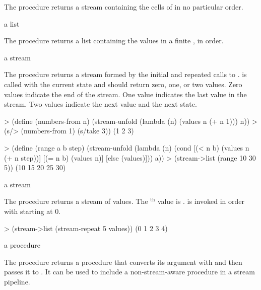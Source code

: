 The  procedure returns a stream containing the cells of
 in no particular order.

\begin{procedure}
\end{procedure}
\returns{} a list

The  procedure returns a list containing the values in a finite
, in order.

\begin{procedure}
\end{procedure}
\returns{} a stream

The  procedure returns a stream formed by the initial  and
repeated calls to .  is called with the current state and
should return zero, one, or two values. Zero values indicate the end of the stream. One
value indicates the last value in the stream. Two values indicate the next value and the
next state.

\codebegin
> (define (numbers-from n)
    (stream-unfold (lambda (n) (values n (+ n 1))) n))
> (s/> (numbers-from 1) (s/take 3))
(1 2 3)
\codeend

\codebegin
> (define (range a b step)
    (stream-unfold
     (lambda (n)
       (cond
        [(< n b) (values n (+ n step))]
        [(= n b) (values n)]
        [else (values)]))
     a))
> (stream->list (range 10 30 5))
(10 15 20 25 30)
\codeend

\begin{procedure}
\end{procedure}
\returns{} a stream

The  procedure returns a stream of  values. The
$^\textrm{th}$ value is .  is invoked in
order with  starting at 0.

\codebegin
> (stream->list (stream-repeat 5 values))
(0 1 2 3 4)
\codeend

\begin{procedure}
\end{procedure}
\returns{} a procedure

The  procedure returns a procedure that converts its argument with
 and then passes it to . It can be used to include a
non-stream-aware procedure in a stream pipeline.

